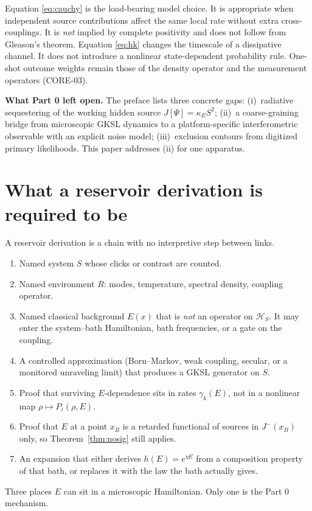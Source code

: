 \documentclass[11pt]{article}
\theoremstyle{definition}
\theoremstyle{plain}
\begin{document}
Equation \eqref{eq:cauchy} is the load-bearing model choice. It is appropriate when independent
source contributions affect the same local rate without extra cross-couplings. It is \emph{not} implied by
complete positivity and does not follow from Gleason's theorem. Equation \eqref{eq:hk} changes the
timescale of a dissipative channel. It does not introduce a nonlinear state-dependent probability
rule. One-shot outcome weights remain those of the density operator and the measurement
operators (CORE-03).

\textbf{What Part 0 left open.} The preface lists three concrete gaps: (i)~radiative sequestering
of the working hidden source $J[\Psi] = \kappa_E S^2$; (ii)~a coarse-graining bridge from microscopic
GKSL dynamics to a platform-specific interferometric observable with an explicit noise model;
(iii)~exclusion contours from digitized primary likelihoods. This paper addresses (ii) for one
apparatus.

\section{What a reservoir derivation is required to be}\label{sec:requirements}

A reservoir derivation is a chain with no interpretive step between links.
\begin{enumerate}
\item Named system $S$ whose clicks or contrast are counted.
\item Named environment $R$: modes, temperature, spectral density, coupling operator.
\item Named classical background $E(x)$ that is \emph{not} an operator on $\mathcal{H}_S$. It may enter the
system--bath Hamiltonian, bath frequencies, or a gate on the coupling.
\item A controlled approximation (Born--Markov, weak coupling, secular, or a monitored
unraveling limit) that produces a GKSL generator on $S$.
\item Proof that surviving $E$-dependence sits in rates $\gamma_k(E)$, not in a nonlinear map $\rho \mapsto P_i(\rho,E)$.
\item Proof that $E$ at a point $x_B$ is a retarded functional of sources in $J^-(x_B)$ only, so
Theorem~\ref{thm:nosig} still applies.
\item An expansion that either derives $h(E)=e^{\eta E}$ from a composition property of that bath,
or replaces it with the law the bath actually gives.
\end{enumerate}
Three places $E$ can sit in a microscopic Hamiltonian. Only one is the Part 0 mechanism.
\end{document}
